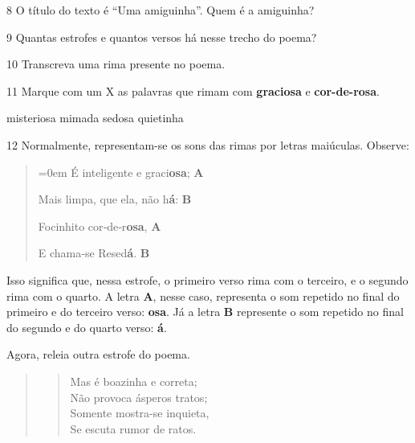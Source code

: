 

\num{8} O título do texto é ``Uma amiguinha''. Quem é a amiguinha?


\num{9} Quantas estrofes e quantos versos há nesse trecho do poema?


\num{10} Transcreva uma rima presente no poema.


\num{11} Marque com um X as palavras que rimam com \textbf{graciosa} e \textbf{cor-de-rosa}.

\begin{boxlist}
 misteriosa
 mimada
 sedosa
 quietinha
\end{boxlist}

\num{12} Normalmente, representam-se os sons das rimas por letras maiúculas. Observe:

\begin{quote}\parindent=0em
É inteligente e graci\textbf{osa}; \textbf{A}

Mais limpa, que ela, não h\textbf{á}: \textbf{B}

Focinhito cor‑de‑r\textbf{osa}, \textbf{A}

E chama‑se Resed\textbf{á}. \textbf{B}
\end{quote}

Isso significa que, nessa estrofe, o primeiro verso rima com o terceiro, e o segundo rima com o quarto. A letra \textbf{A}, nesse caso, representa o som repetido no final do primeiro e do terceiro verso: \textbf{osa}. Já a letra \textbf{B} represente o som repetido no final do segundo e do quarto verso: \textbf{á}.

Agora, releia outra estrofe do poema.

\begin{quote}
\begin{verse}
Mas é boazinha e correta;\\
Não provoca ásperos tratos;\\
Somente mostra-se inquieta,\\
Se escuta rumor de ratos.
\end{verse}
\end{quote}

